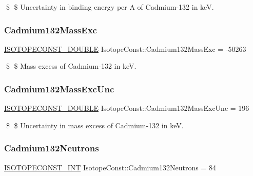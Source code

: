\$ \$ Uncertainty in binding energy per A of Cadmium-\/132 in keV. \mbox{\label{group___isotope_const-_cadmium-_cd132_ga919cecb5a584605c5192cadd07b30a93}} 
\subsubsection{\texorpdfstring{Cadmium132\+Mass\+Exc}{Cadmium132MassExc}}
{\footnotesize\ttfamily \mbox{\hyperlink{group___isotope_const-_macros_ga8f45a7272ce02c0b4c65c44636ed719a}{I\+S\+O\+T\+O\+P\+E\+C\+O\+N\+S\+T\+\_\+\+D\+O\+U\+B\+LE}} Isotope\+Const\+::\+Cadmium132\+Mass\+Exc = -\/50263}

\$ \$ Mass excess of Cadmium-\/132 in keV. \mbox{\label{group___isotope_const-_cadmium-_cd132_ga438278ac2853c0679391ef9291eecae3}} 
\subsubsection{\texorpdfstring{Cadmium132\+Mass\+Exc\+Unc}{Cadmium132MassExcUnc}}
{\footnotesize\ttfamily \mbox{\hyperlink{group___isotope_const-_macros_ga8f45a7272ce02c0b4c65c44636ed719a}{I\+S\+O\+T\+O\+P\+E\+C\+O\+N\+S\+T\+\_\+\+D\+O\+U\+B\+LE}} Isotope\+Const\+::\+Cadmium132\+Mass\+Exc\+Unc = 196}

\$ \$ Uncertainty in mass excess of Cadmium-\/132 in keV. \mbox{\label{group___isotope_const-_cadmium-_cd132_gaab1448e10e47a76259916f9aff833f4e}} 
\subsubsection{\texorpdfstring{Cadmium132\+Neutrons}{Cadmium132Neutrons}}
{\footnotesize\ttfamily \mbox{\hyperlink{group___isotope_const-_macros_ga5f18360b3e99483a35c32d789e62621c}{I\+S\+O\+T\+O\+P\+E\+C\+O\+N\+S\+T\+\_\+\+I\+NT}} Isotope\+Const\+::\+Cadmium132\+Neutrons = 84}

